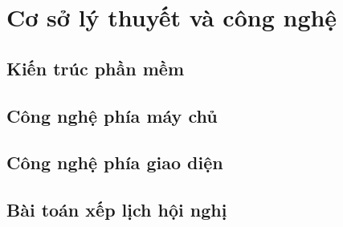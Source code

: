 \chapter{Cơ sở lý thuyết và công nghệ}
\section{Kiến trúc phần mềm}
\chuaviet
\section{Công nghệ phía máy chủ}
\chuaviet
\section{Công nghệ phía giao diện}
\chuaviet
\section{Bài toán xếp lịch hội nghị}
\chuaviet
